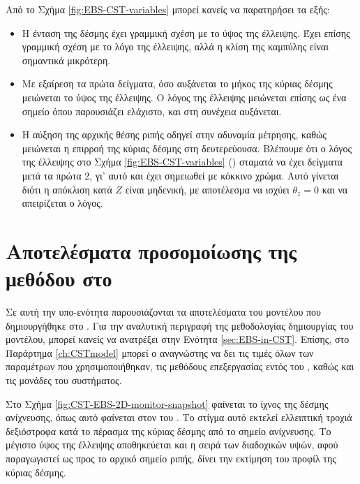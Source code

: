 Από το Σχήμα \ref{fig:EBS-CST-variables} μπορεί κανείς να παρατηρήσει τα εξής:
\begin{itemize}
\item Η ένταση της δέσμης έχει γραμμική σχέση με το ύψος της έλλειψης. 
Έχει επίσης γραμμική σχέση με το λόγο της έλλειψης, αλλά η κλίση της καμπύλης είναι σημαντικά μικρότερη.
\item Με εξαίρεση τα πρώτα δείγματα, όσο αυξάνεται το μήκος της κύριας δέσμης μειώνεται το ύψος της έλλειψης.
Ο λόγος της έλλειψης μειώνεται επίσης ως ένα σημείο όπου παρουσιάζει ελάχιστο, και στη συνέχεια αυξάνεται.
\item Η αύξηση της αρχικής θέσης ριπής οδηγεί στην αδυναμία μέτρησης, καθώς μειώνεται η επιρροή της κύριας δέσμης στη δευτερεύουσα.
Βλέπουμε ότι ο λόγος της έλλειψης στο Σχήμα \ref{fig:EBS-CST-variables} () σταματά να έχει δείγματα μετά τα πρώτα 2, γι' αυτό και έχει σημειωθεί με κόκκινο χρώμα.
Αυτό γίνεται διότι η απόκλιση κατά $Z$ είναι μηδενική, με αποτέλεσμα να ισχύει $\theta_z = 0$ και να απειρίζεται ο λόγος.
\end{itemize}







\section{Αποτελέσματα προσομοίωσης της μεθόδου στο }

Σε αυτή την υπο-ενότητα παρουσιάζονται τα αποτελέσματα του μοντέλου που δημιουργήθηκε στο .
Για την αναλυτική περιγραφή της μεθοδολογίας δημιουργίας του μοντέλου, μπορεί κανείς να ανατρέξει στην Ενότητα \ref{sec:EBS-in-CST}.
Επίσης, στο Παράρτημα \ref{ch:CSTmodel} μπορεί ο αναγνώστης να δει τις τιμές όλων των παραμέτρων που χρησιμοποιήθηκαν, τις μεθόδους επεξεργασίας εντός του , καθώς και τις μονάδες του συστήματος.

Στο Σχήμα \ref{fig:CST-EBS-2D-monitor-snapshot} φαίνεται το ίχνος της δέσμης ανίχνευσης, όπως αυτό φαίνεται στον  του . 
Το στίγμα αυτό εκτελεί ελλειπτική τροχιά δεξιόστροφα κατά το πέρασμα της κύριας δέσμης από το σημείο ανίχνευσης.
Το μέγιστο ύψος της έλλειψης αποθηκεύεται και η σειρά των διαδοχικών υψών, αφού παραγωγιστεί ως προς το αρχικό σημείο ριπής, δίνει την εκτίμηση του προφίλ της κύριας δέσμης.


